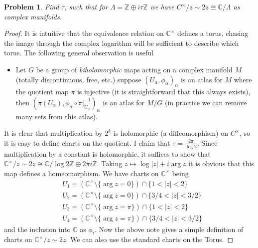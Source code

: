 \documentclass[11pt]{article}
\theoremstyle{definition}
\newtheorem{pb}{Problem}
\newcommand{\set}[1]{\{#1\}}
\newcommand{\abs}[1]{\lvert#1\rvert}
\begin{document}
    \begin{pb}
        \emph{Find \(\tau\), such that for \(\Lambda = \mathbb{Z}\oplus i\tau \mathbb{Z}\) we have \(C^\times/z\sim 2z \cong \mathbb{C}/\Lambda\) as complex manifolds.}

        \begin{proof}
            It is intuitive that the equivalence relation on \(\mathbb{C}^\times\) defines a torus, chasing the image through the complex logarithm will be sufficient to describe which torus. The following general observation is useful

            \begin{itemize}
                \item Let \(G\) be a group of \emph{biholomorphic} maps acting on a complex manifold \(M\) (totally discontinuous, free, etc.) suppose \((U_\alpha,\phi_\alpha)_\alpha\) is an atlas for \(M\) where the quotient map \(\pi\) is injective (it is straightforward that this always exists), then \((\pi(U_\alpha),\phi_\alpha\circ \pi\vert_{U_\alpha}^{-1})_\alpha\) is an atlas for \(M/G\) (in practice we can remove many sets from this atlas).
            \end{itemize}

            It is clear that multiplication by \(2^k\) is holomorphic (a diffeomorphism) on \(C^\times\), so it is easy to define charts on the quotient. I claim that \(\tau = \frac{2\pi}{\log 2}\). Since multiplication by a constant is holomorphic, it suffices to show that \(\mathbb{C}^\times/z\sim 2z \cong \mathbb{C}/\log2\mathbb{Z}\oplus 2\pi i \mathbb{Z}\). Taking \(z \mapsto \log\abs{z} + i\arg z\) it is obvious that this map defines a homeomorphism. We have charts on \(\mathbb{C}^\times\) being 
            \begin{align*}
                &U_1 = \left(\mathbb{C}^\times \setminus \set{\arg z = 0}\right) \cap \set{1 < \abs{z} < 2} \\ &U_2 = \left(\mathbb{C}^\times \setminus \set{\arg z = 0}\right) \cap \set{3/4 < \abs{z} < 3/2} \\ &U_3 = \left(\mathbb{C}^\times \setminus \set{\arg z = \pi}\right)\cap\set{1 < \abs{z} < 2} \\ &U_4 = \left(\mathbb{C}^\times \setminus\set{\arg z = \pi}\right)\cap \set{3/4 < \abs{z} < 3/2}
            \end{align*} and the inclusion into \(\mathbb{C}\) as \(\phi_i\). Now the above note gives a simple definition of charts on \(\mathbb{C}^\times/z \sim 2z\). We can also use the standard charts on the Torus.


\end{proof}
\end{pb}
\end{document}
